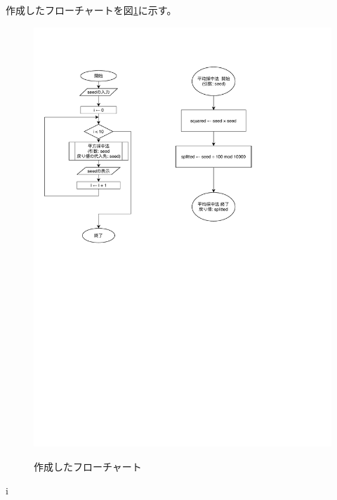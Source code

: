 
作成したフローチャートを図\ref{作成したフローチャート}に示す。

\begin{figure}[H]
    \centering
    \includegraphics[width=0.8\hsize,pagebox=mediabox, page=1]{flowchart.pdf}
    \label{作成したフローチャート}
    \caption{作成したフローチャート}
\end{figure}


i